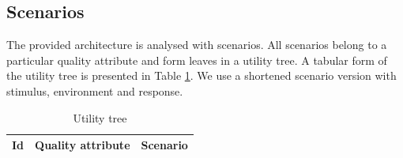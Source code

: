 \documentclass{llncs}
\begin{document}
\subsection{Scenarios}
\label{sec:scenarios}
The provided architecture is analysed with scenarios. All scenarios belong to a particular quality attribute and form leaves in a utility tree. A tabular  form of the utility tree is presented in Table \ref{tbl:utilitytree}. We use a shortened scenario version \cite{bass2012softwareArchitecture} with stimulus, environment and response.
\begin{table}
	\setlength{\tabcolsep}{0.3em}	
	\caption{Utility tree}
	\label{tbl:utilitytree}
	\begin{center}
		\begin{tabular}{c | p{2.2cm} | c}
			\hline			
			Id &
			Quality \newline attribute&	Scenario \\		
			\hline


\end{tabular}
\end{center}
\end{table}
\end{document}
